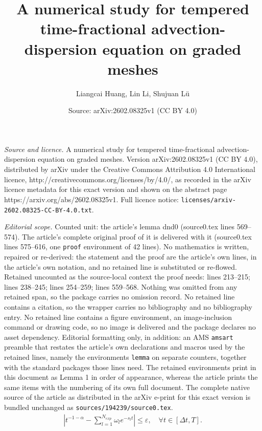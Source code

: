 \documentclass[10pt,a4paper]{amsart}
\title{A numerical study for tempered time-fractional advection-dispersion equation on graded meshes}
\author{Liangcai Huang, Lin Li, Shujuan L\"u}
\date{Source: arXiv:2602.08325v1 (CC BY 4.0)}
\begin{document}
\maketitle

\noindent\emph{Source and licence.} A numerical study for tempered time-fractional advection-dispersion equation on graded meshes. Version arXiv:2602.08325v1 (CC BY 4.0), distributed by arXiv under the Creative Commons Attribution 4.0 International licence, http://creativecommons.org/licenses/by/4.0/, as recorded in the arXiv licence metadata for this exact version and shown on the abstract page https://arxiv.org/abs/2602.08325v1. Full licence notice: \texttt{licenses/arxiv-2602.08325-CC-BY-4.0.txt}.\par\smallskip

\noindent\textit{Editorial scope.} Counted unit: the article's lemma dnd0 (source0.tex lines 569--574). The article's complete original proof of it is delivered with it (source0.tex lines 575--616, one \texttt{proof} environment of 42 lines). No mathematics is written, repaired or re-derived: the statement and the proof are the article's own lines, in the article's own notation, and no retained line is substituted or re-flowed.  Retained uncounted as the source-local context the proof needs: lines 213--215; lines 238--245; lines 254--259; lines 559--568.  Nothing was omitted from any retained span, so the package carries no omission record.  No retained line contains a citation, so the wrapper carries no bibliography and no bibliography entry.  No retained line contains a figure environment, an image-inclusion command or drawing code, so no image is delivered and the package declares no asset dependency.  Editorial formatting only, in addition: an AMS \texttt{amsart} preamble that restates the article's own declarations and macros used by the retained lines, namely the environments \texttt{lemma} on separate counters, together with the standard packages those lines need.  The retained environments print in this document as Lemma 1 in order of appearance, whereas the article prints the same items with the numbering of its own full document.  The complete native source of the article as distributed in the arXiv e-print for this exact version is bundled unchanged as \texttt{sources/194239/source0.tex}.
\begin{align}
    |t^{-1-\alpha}-\sum_{l=1}^{N_{exp}}\omega_le^{-s_lt}|\leq \varepsilon, \quad \forall t\in [\Delta t,T].\label{SOE}
\end{align}
\end{document}
